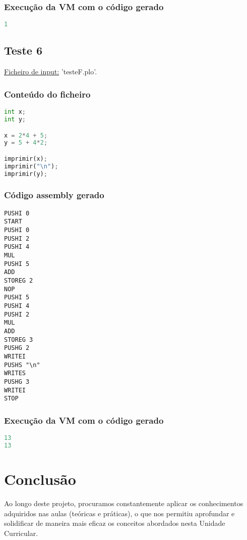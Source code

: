 \documentclass[11pt,a4paper]{report}
\begin{document}
\subsection{Execução da VM com o código gerado}
\begin{lstlisting}[language=python]
1
\end{lstlisting}

\section{Teste 6}

\underline{Ficheiro de input:} 'testeF.plo'.

\subsection{Conteúdo do ficheiro}

\begin{lstlisting}[language=python]
int x;
int y;

x = 2*4 + 5;
y = 5 + 4*2;    

imprimir(x);
imprimir("\n");
imprimir(y);
\end{lstlisting}

\subsection{Código assembly gerado}
\begin{lstlisting}[languague=Assembler]
PUSHI 0
START
PUSHI 0
PUSHI 2
PUSHI 4
MUL
PUSHI 5
ADD
STOREG 2
NOP
PUSHI 5
PUSHI 4
PUSHI 2
MUL
ADD
STOREG 3
PUSHG 2
WRITEI
PUSHS "\n"
WRITES
PUSHG 3
WRITEI
STOP
\end{lstlisting}

\subsection{Execução da VM com o código gerado}
\begin{lstlisting}[language=python]
13
13
\end{lstlisting}

\chapter{Conclusão}

Ao longo deste projeto, procuramos constantemente aplicar os conhecimentos adquiridos nas aulas (teóricas e práticas), o que nos permitiu aprofundar e solidificar de maneira mais eficaz os conceitos abordados nesta Unidade Curricular.
\end{document}
